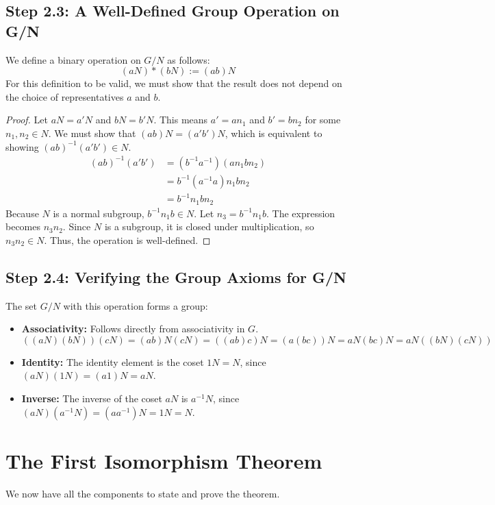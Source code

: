 \subsection*{Step 2.3: A Well-Defined Group Operation on G/N}
We define a binary operation on $G/N$ as follows:
\[
(aN) * (bN) := (ab)N
\]
For this definition to be valid, we must show that the result does not depend on the choice of representatives $a$ and $b$.
\begin{proof}
Let $aN = a'N$ and $bN = b'N$. This means $a' = an_1$ and $b' = bn_2$ for some $n_1, n_2 \in N$. We must show that $(ab)N = (a'b')N$, which is equivalent to showing $(ab)^{-1}(a'b') \in N$.
\begin{align*}
(ab)^{-1}(a'b') &= (b^{-1}a^{-1})(an_1bn_2) \\
&= b^{-1}(a^{-1}a)n_1bn_2 \\
&= b^{-1}n_1bn_2
\end{align*}
Because $N$ is a normal subgroup, $b^{-1}n_1b \in N$. Let $n_3 = b^{-1}n_1b$. The expression becomes $n_3n_2$. Since $N$ is a subgroup, it is closed under multiplication, so $n_3n_2 \in N$. Thus, the operation is well-defined.
\end{proof}

\subsection*{Step 2.4: Verifying the Group Axioms for G/N}
The set $G/N$ with this operation forms a group:
\begin{itemize}
    \item \textbf{Associativity:} Follows directly from associativity in $G$.
    \[((aN)(bN))(cN) = (ab)N(cN) = ((ab)c)N = (a(bc))N = aN(bc)N = aN((bN)(cN))\]
    \item \textbf{Identity:} The identity element is the coset $1N = N$, since $(aN)(1N) = (a1)N = aN$.
    \item \textbf{Inverse:} The inverse of the coset $aN$ is $a^{-1}N$, since $(aN)(a^{-1}N) = (aa^{-1})N = 1N = N$.
\end{itemize}

\section{The First Isomorphism Theorem}

We now have all the components to state and prove the theorem.

